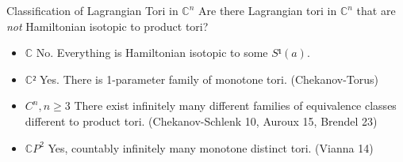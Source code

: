 \documentclass[aspectratio=169]{beamer}
\begin{document}
\begin{frame}{Classification of Lagrangian Tori in $ℂ^n$}
  Are there Lagrangian tori in $ℂ^n$ that are \emph{not} Hamiltonian isotopic to product tori?

  \begin{itemize}
    \item<2-> $ℂ$ No. Everything is Hamiltonian isotopic to some $S¹(a)$.
    
    \item<3-> $ℂ²$ Yes. There is 1-parameter family of monotone tori. (Chekanov-Torus)
    
    \item<4-> $C^n, n ≥ 3$ There exist infinitely many different families of equivalence classes different to product tori. (Chekanov-Schlenk 10, Auroux 15, Brendel 23)
    
    \item<5-> $ℂP^2$ Yes, countably infinitely many monotone distinct tori. (Vianna 14)
  \end{itemize}
\end{frame}
\end{document}
